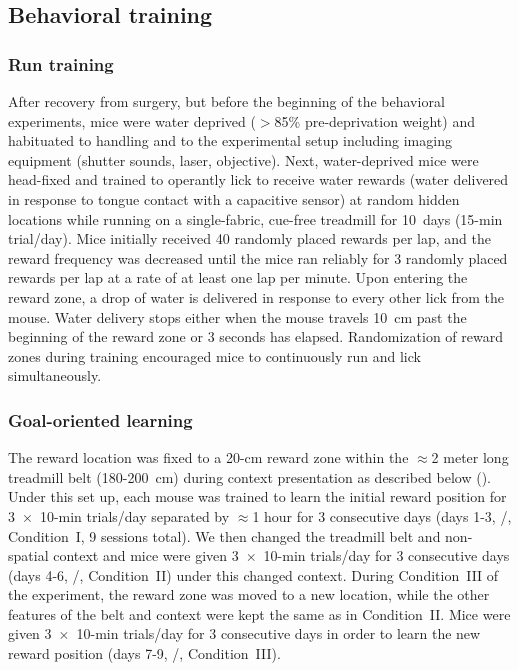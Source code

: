 \subsection{Behavioral training}
\label{sec:df:methods:training}
\subsubsection{Run training}
After recovery from surgery, but before the beginning of the behavioral experiments, mice were water deprived ($>$85\% pre-deprivation weight) and habituated to handling and to the experimental setup including imaging equipment (shutter sounds, laser, objective). Next, water-deprived mice were head-fixed and trained to operantly lick to receive water rewards (water delivered in response to tongue contact with a capacitive sensor) at random hidden locations while running on a single-fabric, cue-free treadmill for 10~days (15-min trial/day). Mice initially received 40 randomly placed rewards per lap, and the reward frequency was decreased until the mice ran reliably for 3 randomly placed rewards per lap at a rate of at least one lap per minute. Upon entering the reward zone, a drop of water is delivered in response to every other lick from the mouse. Water delivery stops either when the mouse travels 10~cm past the beginning of the reward zone or 3 seconds has elapsed. Randomization of reward zones during training encouraged mice to continuously run and lick simultaneously.
\subsubsection{Goal-oriented learning}
\label{sec:df:methods:GOL}
The reward location was fixed to a 20-cm reward zone within the $\approx$2 meter long treadmill belt (180-200~cm) during context presentation as described below (). Under this set up, each mouse was trained to learn the initial reward position for 3~$\times$~10-min trials/day separated by $\approx$1 hour for 3 consecutive days (days 1-3, \A/, Condition~I, 9 sessions total). We then changed the treadmill belt and non-spatial context and mice were given 3~$\times$~10-min trials/day for 3 consecutive days (days 4-6, \Aprime/, Condition~II) under this changed context. During Condition~III of the experiment, the reward zone was moved to a new location, while the other features of the belt and context were kept the same as in Condition~II. Mice were given 3~$\times$~10-min trials/day for 3 consecutive days in order to learn the new reward position (days 7-9, \Aprime/, Condition~III).

